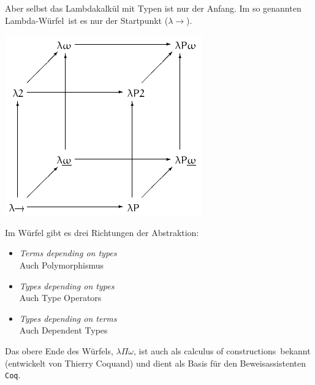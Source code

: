 \documentclass{beamer}
\begin{document}
\begin{frame}

Aber selbst das Lambdakalkül mit Typen ist nur der Anfang. Im so genannten \glqq Lambda-Würfel\grqq\ ist es nur der Startpunkt ($\lambda\to$).

\begin{multicols}{2}
\begin{center}
\includegraphics[scale=0.4]{Lambda_cube.png} 
\end{center}
\columnbreak

Im Würfel gibt es drei Richtungen der Abstraktion:\smallskip\smallskip

\begin{itemize}
\pause\item \textit{Terms depending on types}
            \\ Auch \glqq Polymorphismus\grqq\
\pause\item \textit{Types depending on types}
            \\ Auch \glqq Type Operators\grqq\
\pause\item \textit{Types depending on terms}
            \\ Auch \glqq Dependent Types\grqq\
\end{itemize}

\end{multicols}
\pause

Das obere Ende des Würfels, $\lambda\Pi\omega$, ist auch als \glqq calculus of constructions\grqq\ bekannt (entwickelt von Thierry Coquand) und dient als Basis für den Beweisassistenten \texttt{Coq}.

\end{frame}

\end{document}
